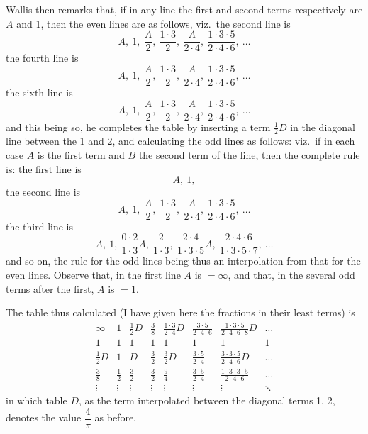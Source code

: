 \documentclass[11pt,a4paper]{book}
\begin{document}
Wallis then remarks that, if in any line the first and second terms respectively are $A$ and 1, then the even lines are as follows, viz.\ the second line is
\[
A,\ 1,\ \frac{A}{2},\ \frac{1 \cdot 3}{2},\ \frac{A}{2 \cdot 4},\ \frac{1 \cdot 3 \cdot 5}{2 \cdot 4 \cdot 6},\ \ldots
\]
the fourth line is
\[
A,\ 1,\ \frac{A}{2},\ \frac{1 \cdot 3}{2},\ \frac{A}{2 \cdot 4},\ \frac{1 \cdot 3 \cdot 5}{2 \cdot 4 \cdot 6},\ \ldots
\]
the sixth line is
\[
A,\ 1,\ \frac{A}{2},\ \frac{1 \cdot 3}{2},\ \frac{A}{2 \cdot 4},\ \frac{1 \cdot 3 \cdot 5}{2 \cdot 4 \cdot 6},\ \ldots
\]
and this being so, he completes the table by inserting a term $\tfrac{1}{2}D$ in the diagonal line between the 1 and 2, and calculating the odd lines as follows: viz.\ if in each case $A$ is the first term and $B$ the second term of the line, then the complete rule is:
the first line is
\[
A,\ 1,
\]
the second line is
\[
A,\ 1,\ \frac{A}{2},\ \frac{1 \cdot 3}{2},\ \frac{A}{2 \cdot 4},\ \frac{1 \cdot 3 \cdot 5}{2 \cdot 4 \cdot 6},\ \ldots
\]
the third line is
\[
A,\ 1,\ \frac{0 \cdot 2}{1 \cdot 3}A,\ \frac{2}{1 \cdot 3},\ \frac{2 \cdot 4}{1 \cdot 3 \cdot 5}A,\ \frac{2 \cdot 4 \cdot 6}{1 \cdot 3 \cdot 5 \cdot 7},\ \ldots
\]
and so on, the rule for the odd lines being thus an interpolation from that for the even lines. Observe that, in the first line $A$ is $= \infty$, and that, in the several odd terms after the first, $A$ is $=1$.

The table thus calculated (I have given here the fractions in their least terms) is
\[
\begin{array}{cccccccc}
\infty & 1 & \tfrac{1}{2}D & \tfrac{3}{8} & \tfrac{1 \cdot 3}{2 \cdot 4}D & \tfrac{3 \cdot 5}{2 \cdot 4 \cdot 6} & \tfrac{1 \cdot 3 \cdot 5}{2 \cdot 4 \cdot 6 \cdot 8}D & \ldots \\
1 & 1 & 1 & 1 & 1 & 1 & 1 & 1 \\
\tfrac{1}{2}D & 1 & D & \tfrac{3}{2} & \tfrac{3}{2}D & \tfrac{3 \cdot 5}{2 \cdot 4} & \tfrac{3 \cdot 3 \cdot 5}{2 \cdot 4 \cdot 6}D & \ldots \\
\tfrac{3}{8} & \tfrac{1}{2} & \tfrac{3}{2} & \tfrac{3}{2} & \tfrac{9}{4} & \tfrac{3 \cdot 5}{2 \cdot 4} & \tfrac{1 \cdot 3 \cdot 3 \cdot 5}{2 \cdot 4 \cdot 6} & \ldots \\
\vdots & \vdots & \vdots & \vdots & \vdots & \vdots & \vdots & \ddots
\end{array}
\]
in which table $D$, as the term interpolated between the diagonal terms 1, 2, denotes the value $\dfrac{4}{\pi}$ as before.
\end{document}
